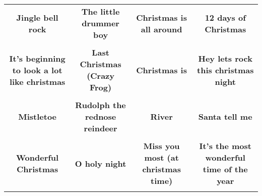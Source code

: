 \documentclass[12pt]{article} \usepackage{eso-pic, graphicx}
\newcommand{\background}[1]{%
\AddToShipoutPictureBG*{\texttt{[image: \#1]}}
}
\begin{document}
\tabcolsep=30.2pt \renewcommand{\arraystretch}{4.5}   \vspace*{4.3cm} \begin{center}  \begin{tabular}{c c c c}
\parbox{3cm}{\centering \textbf{Jingle bell rock}}& 
\parbox{3cm}{\centering \textbf{The little drummer boy}}& 
\parbox{3cm}{\centering \textbf{Christmas is all around}}& 
\parbox{3cm}{\centering \textbf{12 days of Christmas}}\\ \\ 
\parbox{3cm}{\centering \textbf{It’s beginning to look a lot like christmas}}& 
\parbox{3cm}{\centering \textbf{Last Christmas (Crazy Frog)}}& 
\parbox{3cm}{\centering \textbf{Christmas is}}& 
\parbox{3cm}{\centering \textbf{Hey lets rock this christmas night}}\\ \\ 
\parbox{3cm}{\centering \textbf{Mistletoe}}& 
\parbox{3cm}{\centering \textbf{Rudolph the rednose reindeer}}& 
\parbox{3cm}{\centering \textbf{River}}& 
\parbox{3cm}{\centering \textbf{Santa tell me}}\\ \\ 
\parbox{3cm}{\centering \textbf{Wonderful Christmas}}& 
\parbox{3cm}{\centering \textbf{O holy night}}& 
\parbox{3cm}{\centering \textbf{Miss you most (at christmas time)}}& 
\parbox{3cm}{\centering \textbf{It’s the most wonderful time of the year}}\\ \\ 
\end{tabular} \background{discobingo.pdf} \end{center} 
\end{document}
